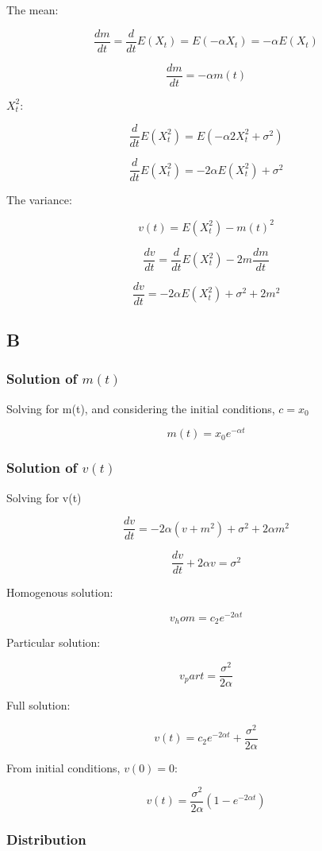 \documentclass{article}
\begin{document}
The mean:

$$\frac{dm}{dt} = \frac{d}{dt}E(X_t) = E(-\alpha X_t) = -\alpha E(X_t)$$

$$\frac{dm}{dt} = -\alpha m(t)$$

$X_t^2$:

$$\frac{d}{dt}E(X_t^2) = E(- \alpha 2X_t^2 + \sigma^2)$$

$$\frac{d}{dt}E(X_t^2) = -2 \alpha E(X_t^2) + \sigma^2$$

The variance:

$$v(t) = E(X_t^2) -m(t)^2$$

$$\frac{dv}{dt} = \frac{d}{dt}E(X_t^2) - 2m\frac{dm}{dt}$$

$$\frac{dv}{dt} = -2 \alpha E(X_t^2) + \sigma^2 + 2m^2$$

\subsection{B}

\subsubsection{Solution of $m(t)$}

Solving for m(t), and considering the initial conditions, $c=x_0$

$$m(t) = x_0 e^{-\alpha t}$$

\subsubsection{Solution of $v(t)$}

Solving for v(t)

$$\frac{dv}{dt} = -2 \alpha (v + m^2) + \sigma^2 + 2 \alpha m^2$$

$$\frac{dv}{dt} +  2 \alpha v = \sigma^2$$

Homogenous solution:

$$v_hom = c_2 e^{-2 \alpha t}$$

Particular solution:

$$v_part = \frac{\sigma^2}{2 \alpha}$$

Full solution:

$$ v(t) = c_2 e^{-2 \alpha t} + \frac{\sigma^2}{2 \alpha}$$

From initial conditions, $v(0) = 0$:

$$ v(t) = \frac{\sigma^2}{2 \alpha}(1-e^{-2 \alpha t})$$

\subsubsection{Distribution}
\end{document}
